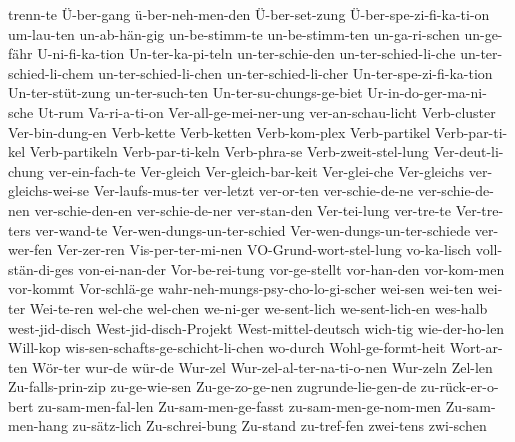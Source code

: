 {trenn-te
Ü-ber-gang
ü-ber-neh-men-den
Ü-ber-set-zung
Ü-ber-spe-zi-fi-ka-ti-on
um-lau-ten
un-ab-hän-gig
un-be-stimm-te
un-be-stimm-ten
un-ga-ri-schen
un-ge-fähr
U-ni-fi-ka-tion
Un-ter-ka-pi-teln
un-ter-schie-den
un-ter-schied-li-che
un-ter-schied-li-chem
un-ter-schied-li-chen
un-ter-schied-li-cher
Un-ter-spe-zi-fi-ka-tion
Un-ter-stüt-zung
un-ter-such-ten
Un-ter-su-chungs-ge-biet
Ur-in-do-ger-ma-ni-sche
Ut-rum
Va-ri-a-ti-on
Ver-all-ge-mei-ner-ung
ver-an-schau-licht
Verb-cluster
Ver-bin-dung-en
Verb-kette
Verb-ketten
Verb-kom-plex
Verb-partikel
Verb-par-ti-kel
Verb-partikeln
Verb-par-ti-keln
Verb-phra-se
Verb-zweit-stel-lung
Ver-deut-li-chung
ver-ein-fach-te
Ver-gleich
Ver-gleich-bar-keit
Ver-glei-che
Ver-gleichs
ver-gleichs-wei-se
Ver-laufs-mus-ter
ver-letzt
ver-or-ten
ver-schie-de-ne
ver-schie-de-nen
ver-schie-den-en
ver-schie-de-ner
ver-stan-den
Ver-tei-lung
ver-tre-te
Ver-tre-ters
ver-wand-te
Ver-wen-dungs-un-ter-schied
Ver-wen-dungs-un-ter-schiede
ver-wer-fen
Ver-zer-ren
Vis-per-ter-mi-nen
VO-Grund-wort-stel-lung
vo-ka-lisch
voll-stän-di-ges
von-ei-nan-der
Vor-be-rei-tung
vor-ge-stellt
vor-han-den
vor-kom-men
vor-kommt
Vor-schlä-ge
wahr-neh-mungs-psy-cho-lo-gi-scher
wei-sen
wei-ten
wei-ter
Wei-te-ren
wel-che
wel-chen
we-ni-ger
we-sent-lich
we-sent-lich-en
wes-halb
west-jid-disch
West-jid-disch-Projekt
West-mittel-deutsch
wich-tig
wie-der-ho-len
Will-kop
wis-sen-schafts-ge-schicht-li-chen
wo-durch
Wohl-ge-formt-heit
Wort-ar-ten
Wör-ter
wur-de
wür-de
Wur-zel
Wur-zel-al-ter-na-ti-o-nen
Wur-zeln
Zel-len
Zu-falls-prin-zip
zu-ge-wie-sen
Zu-ge-zo-ge-nen
zugrunde-lie-gen-de
zu-rück-er-o-bert
zu-sam-men-fal-len
Zu-sam-men-ge-fasst
zu-sam-men-ge-nom-men
Zu-sam-men-hang
zu-sätz-lich
Zu-schrei-bung
Zu-stand
zu-tref-fen
zwei-tens
zwi-schen
}